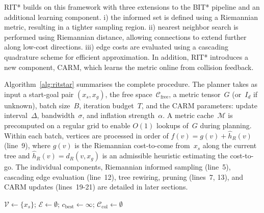 \documentclass[journal]{IEEEtran}
\newcommand{\Cfree}{\mathcal{C}_{\mathrm{free}}}
\begin{document}
RIT* builds on this framework with three extensions to the BIT*
pipeline and an additional learning component. i) the informed set
is defined using a Riemannian metric, resulting in a tighter sampling
region. ii) nearest neighbor search is performed using Riemannian
distance, allowing connections to extend further along low-cost
directions. iii) edge costs are evaluated using a cascading quadrature scheme for efficient approximation. In addition, RIT*
introduces a new component, CARM, which learns the metric online from collision feedback.

Algorithm~\ref{alg:ritstar} summarises the complete procedure. The
planner takes as input a start-goal pair $(x_s, x_g)$, the
free space~$\Cfree$, a metric tensor~$G$ (or~$I_d$ if
unknown), batch size~$B$, iteration budget~$T$, and the CARM
parameters: update interval~$\Delta$, bandwidth~$\sigma$,
and inflation strength~$\alpha$. A metric cache~$\mathcal{M}$ is precomputed on a regular grid to enable $O(1)$ lookups of~$G$ during planning. Within each batch, vertices are processed in order of
$f(v) = g(v) + \hat{h}_R(v)$ (line~9), where $g(v)$ is the Riemannian cost-to-come from~$x_s$ along the current tree and $\hat{h}_R(v) = d_R(v, x_g)$ is an admissible heuristic estimating the cost-to-go. The individual components, Riemannian informed sampling (line~5),
cascading edge evaluation (line~12), tree rewiring, pruning (lines~7, 13), and CARM updates (lines~19-21) are detailed in later sections.


\begin{algorithm}[t]
\SetAlgoLined
\KwIn{ $x_s$,  $x_g$,   $\Cfree$,  $G(\cdot)$,
    $B$,  $T$,    $\Delta$,
    $\sigma, \alpha$}
$\mathcal{V} \gets \{x_s\}$; $\mathcal{E} \gets \emptyset$; $c_{\mathrm{best}} \gets \infty$; $\mathcal{C}_{\mathrm{col}} \gets \emptyset$\; 
\Return{$\sigma^*$}
\caption{RIT* planner}
\label{alg:ritstar}
\end{algorithm}
\end{document}
